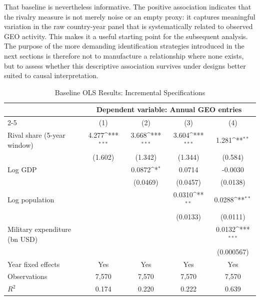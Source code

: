\documentclass[11pt]{article}
\newcommand{\sym}[1]{\ifmmode^{#1}\else\(^{#1}\)\fi}
\begin{document}
That baseline is nevertheless informative. The positive association indicates that the rivalry measure is not merely noise or an empty proxy: it captures meaningful variation in the raw country-year panel that is systematically related to observed GEO activity. This makes it a useful starting point for the subsequent analysis. The purpose of the more demanding identification strategies introduced in the next sections is therefore not to manufacture a relationship where none exists, but to assess whether this descriptive association survives under designs better suited to causal interpretation.

\begin{table}[htbp]
\centering
\caption{Baseline OLS Results: Incremental Specifications}
\label{tab:ols_incremental}
\begin{threeparttable}
\small
\setlength{\tabcolsep}{9pt}
\renewcommand{\arraystretch}{1.15}

\begin{tabular}{lcccc}
\toprule
& \multicolumn{4}{c}{Dependent variable: Annual GEO entries} \\
\cmidrule(lr){2-5}
& (1) & (2) & (3) & (4) \\
\midrule
Rival share (5-year window) 
    & 4.277\sym{***} & 3.668\sym{***} & 3.604\sym{***} & 1.281\sym{**} \\
    & (1.602)        & (1.342)        & (1.344)        & (0.584)        \\
\addlinespace
Log GDP
    &                & 0.0872\sym{*}  & 0.0714         & -0.0030        \\
    &                & (0.0469)       & (0.0457)       & (0.0138)       \\
\addlinespace
Log population
    &                &                & 0.0310\sym{**} & 0.0288\sym{**} \\
    &                &                & (0.0133)       & (0.0111)       \\
\addlinespace
Military expenditure (bn USD)
    &                &                &                & 0.0132\sym{***} \\
    &                &                &                & (0.000567)      \\
\midrule
Year fixed effects & Yes & Yes & Yes & Yes \\
Observations       & 7,570 & 7,570 & 7,570 & 7,570 \\
$R^2$              & 0.174 & 0.220 & 0.222 & 0.639 \\
\bottomrule
\end{tabular}




\end{threeparttable}
\end{table}
\end{document}

